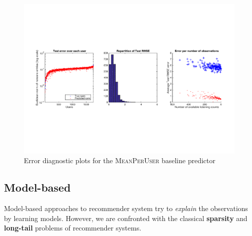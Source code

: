 \documentclass[10pt,a4paper]{article}
\begin{document}
  \begin{figure}[ht]
    \center
      \includegraphics[width=14cm]{figures/recommendation/baseline-predictor-plots.pdf}
    \caption{Error diagnostic plots for the \textsc{MeanPerUser} baseline predictor}
    \label{fig:baseline-predictor-plots}
  \end{figure}


  \subsection{Model-based}
  Model-based approaches to recommender system try to \textit{explain} the observations by learning models. However, we are confronted with the classical \textbf{sparsity} and \textbf{long-tail} problems of recommender systems.\\
\end{document}
